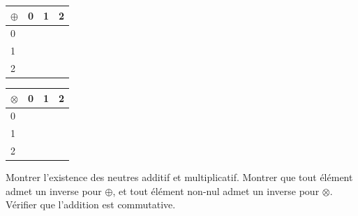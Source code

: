 \documentclass[a4paper, 10pt]{report}
\begin{document}
	\begin{center}
	\begin{tabular}{l|l|l|l|}
		$\oplus$ & 0 & 1 & 2 \\
		\hline
		0 & & & \\
		\hline
		1 & & & \\
		\hline
		2 & & & \\
		\hline
	\end{tabular}
	\qquad
	\begin{tabular}{l|l|l|l|}
		$\otimes$ & 0 & 1 & 2 \\
		\hline
		0 & & & \\
		\hline
		1 & & & \\
		\hline
		2 & & & \\
		\hline
	\end{tabular}
	\end{center}
	
	\noindent
	Montrer l'existence des neutres additif et multiplicatif. Montrer
	que tout élément admet un inverse pour $\oplus$, et tout élément
	non-nul admet un inverse pour $\otimes$.\\
	Vérifier que l'addition	est commutative.
\end{document}
